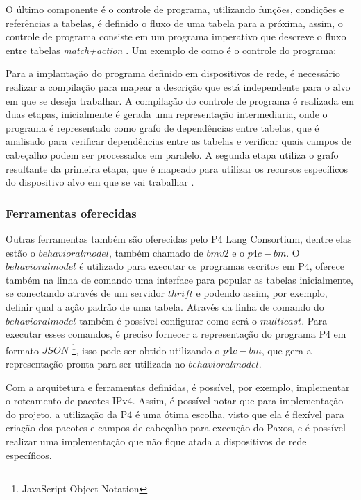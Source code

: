 \documentclass[
    12pt,
    openright, 
    oneside,
    a4paper,
    french,
    english,
    brazil
    ]{facom-ufu-abntex2}
\theoremstyle{definition}
\begin{document}
O último componente é o controle de programa, utilizando funções, condições e referências
a tabelas, é definido o fluxo de uma tabela para a próxima, assim, o controle de programa
consiste em um programa imperativo que descreve o fluxo entre tabelas \textit{match+action} 
\cite{bosshart2014p4}. Um exemplo de como é o controle do programa: 



Para a implantação do programa definido em dispositivos de rede, é necessário realizar
a compilação para mapear a descrição que está independente para o alvo em que se deseja
trabalhar. A compilação do controle de programa é realizada em duas etapas, inicialmente
é gerada uma representação intermediaria, onde o programa é representado como grafo de
dependências entre tabelas, que é analisado para verificar dependências entre as tabelas
e verificar quais campos de cabeçalho podem ser processados em paralelo. A segunda etapa
utiliza o grafo resultante da primeira etapa, que é mapeado para utilizar os recursos
específicos do dispositivo alvo em que se vai trabalhar \cite{bosshart2014p4}.

\subsubsection{Ferramentas oferecidas}
Outras ferramentas também são oferecidas pelo P4 Lang Consortium, dentre elas estão o 
$behavioral model$, também chamado de $bmv2$ e o $p4c-bm$. O $behavioral model$ é utilizado 
para executar os programas escritos em P4, oferece também na linha de comando uma interface 
para popular as tabelas inicialmente, se conectando através de um servidor $thrift$ e podendo 
assim, por exemplo, definir qual a ação padrão de uma tabela. Através da linha de comando do 
$behavioral model$ também é possível configurar como será o $multicast$. Para executar esses 
comandos, é preciso fornecer a representação do programa P4 em formato $JSON$
\footnote{JavaScript Object Notation}, isso pode ser obtido utilizando o $p4c-bm$, que gera a 
representação pronta para ser utilizada no $behavioral model$.

Com a arquitetura e ferramentas definidas, é possível, por exemplo, implementar o roteamento 
de pacotes IPv4. Assim, é possível notar que para implementação do projeto, a utilização da P4
é uma ótima escolha, visto que ela é flexível para criação dos pacotes e campos de cabeçalho
para execução do Paxos, e é possível realizar uma implementação que não fique atada a 
dispositivos de rede específicos.
\end{document}

